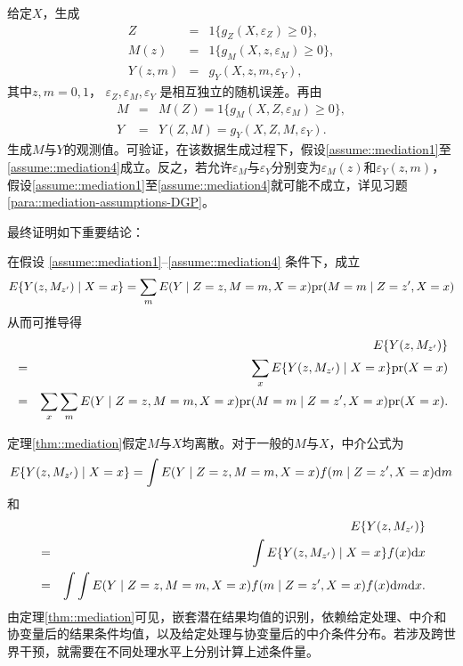 \begin{example}
\label{eg::mediation-assumptions}
给定$X$，生成
\begin{eqnarray*}
Z &=& 1\{  g_Z(X, \varepsilon_Z)  \geq 0 \} ,\\
M(z) &=& 1\{   g_M(X, z, \varepsilon_M)  \geq 0 \} ,\\
Y(z,m) &=& g_Y(X, z, m, \varepsilon_Y ),
\end{eqnarray*}
其中$z,m = 0,1$，
$
\varepsilon_Z, \varepsilon_M,
\varepsilon_Y 
$
是相互独立的随机误差。再由
\begin{eqnarray*}
M &=& M(Z) = 1\{   g_M(X, Z, \varepsilon_M)  \geq 0 \},\\
Y &=& Y(Z,M) = g_Y(X, Z, M, \varepsilon_Y ) . 
\end{eqnarray*}
生成$M$与$Y$的观测值。可验证，在该数据生成过程下，假设\ref{assume::mediation1}至\ref{assume::mediation4}成立。反之，若允许$  \varepsilon_M$与$\varepsilon_Y$分别变为$ \varepsilon_M(z)$和$\varepsilon_Y(z,m)$，假设\ref{assume::mediation1}至\ref{assume::mediation4}就可能不成立，详见习题\ref{para::mediation-assumptions-DGP}。
\end{example}



\citet{Pearl::2001}最终证明如下重要结论： 

\begin{theorem}
\label{thm::mediation}
在假设 \ref{assume::mediation1}--\ref{assume::mediation4} 条件下，成立
$$
E\{ Y(z, M_{z'})  \mid X=x \} =  \sum_m E(Y\mid Z=z, M=m, X=x) \textup{pr}(M =  m \mid Z=z', X=x)   
$$
从而可推导得
\begin{eqnarray*}
&&E\{ Y(z, M_{z'})   \}  \\
&=&  \sum_x E\{ Y(z, M_{z'})  \mid X=x \} \textup{pr}(X =  x )  \\
&=&  \sum_x \sum_m E(Y\mid Z=z, M=m, X=x) \textup{pr}(M =  m \mid Z=z', X=x)   \textup{pr}(X =  x ).
\end{eqnarray*}
\end{theorem}

 

定理\ref{thm::mediation}假定$M$与$X$均离散。对于一般的$M$与$X$，中介公式为
$$
E\{ Y(z, M_{z'}) \mid X=x  \} =   \int  E(Y\mid Z=z, M=m, X=x) f ( m \mid Z=z', X=x) \textnormal{d} m
$$
和
\begin{eqnarray*}
&&E\{ Y(z, M_{z'})   \}  \\
 &=& \int E\{ Y(z, M_{z'}) \mid X=x  \}   f  (x) \textnormal{d} x  \\
 &=& \int \int  E(Y\mid Z=z, M=m, X=x) f ( m \mid Z=z', X=x)     f  (x) \textnormal{d} m \textnormal{d} x   . 
\end{eqnarray*}
由定理\ref{thm::mediation}可见，嵌套潜在结果均值的识别，依赖给定处理、中介和协变量后的结果条件均值，以及给定处理与协变量后的中介条件分布。若涉及跨世界干预，就需要在不同处理水平上分别计算上述条件量。 

